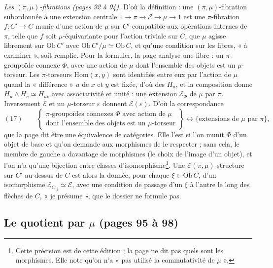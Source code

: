 \documentclass[11pt,a4paper]{article}
\begin{document}
\emph{Les $(\pi, \mu)$-fibrations (pages 92 à 94).} D'où la définition : une
$(\pi, \mu)$-fibration subordonnée à une extension centrale $1 \to \pi \to
\mathcal{E} \to \mu \to 1$ est une $\pi$-fibration $f : C' \to C$ munie d'une
action de $\mu$ sur $C'$ compatible aux opérations internes de $\pi$, telle que
$f$ soit $\mu$-équivariante pour l'action triviale sur $C$, que $\mu$ agisse
librement sur $\mathrm{Ob}\,C'$ avec $\mathrm{Ob}\,C'/\mu \simeq
\mathrm{Ob}\,C$, et qu'une condition sur les fibres, « à examiner », soit
remplie. Pour la formuler, la page analyse une fibre : un $\pi$-groupoïde
connexe $\Phi$, avec une action de $\mu$ dont l'ensemble des objets est un
$\mu$-torseur. Les $\pi$-torseurs $\mathrm{Hom}(x, y)$ sont identifiés entre
eux par l'action de $\mu$ quand la « différence » $u$ de $x$ et $y$ est fixée,
d'où des $H_u$, et la composition donne $H_u \wedge H_v \simeq H_{uv}$ avec
associativité et unité : une extension $\mathcal{E}_\Phi$ de $\mu$ par $\pi$.
Inversement $\mathcal{E}$ et un $\mu$-torseur $\varepsilon$ donnent
$\mathcal{E}(\varepsilon)$. D'où la correspondance
\[
(17)\qquad
\left\{\begin{array}{l}
\pi\text{-groupoïdes connexes } \Phi \text{ avec action de } \mu\\
\text{dont l'ensemble des objets est un } \mu\text{-torseur}
\end{array}\right\}
\longleftrightarrow
\{ \text{extensions de } \mu \text{ par } \pi \},
\]
que la page dit être une équivalence de catégories. Elle l'est si l'on munit
$\Phi$ d'un objet de base et qu'on demande aux morphismes de le
respecter ; sans cela, le membre de gauche a davantage de morphismes (le
choix de l'image d'un objet), et l'on n'a qu'une bijection entre classes
d'isomorphisme\footnote{Cette précision est de cette édition ; la page ne dit
pas quels sont les morphismes. Elle note qu'on n'a « pas utilisé la
commutativité de $\mu$ ».}. Une $\mathcal{E}(\pi, \mu)$-structure sur $C'$
au-dessus de $C$ est alors la donnée, pour chaque $\xi \in \mathrm{Ob}\,C$,
d'un isomorphisme $\mathcal{E}_{C'_\xi} \simeq \mathcal{E}$, avec une condition
de passage d'un $\xi$ à l'autre le long des flèches de $C$, « je présume »,
que le dossier ne formule pas.

\subsection*{Le quotient par $\mu$ (pages 95 à 98)}
\end{document}
